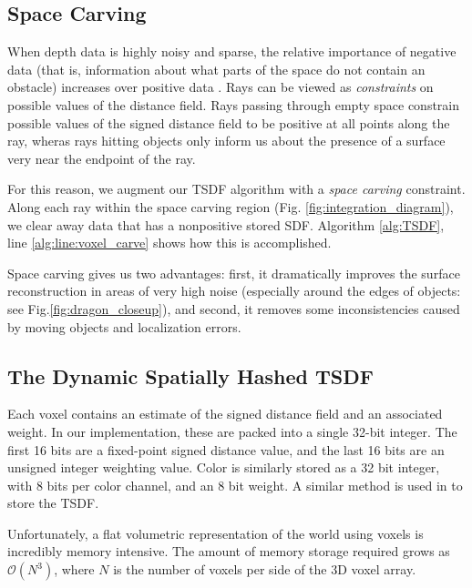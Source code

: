 \documentclass[10pt,twocolumn,letterpaper]{article}
\newcommand{\figref}[1]{Fig.\ref{#1}}
\begin{document}
\subsection{Space Carving}
\label{section:carving}
When depth data is highly noisy and sparse, the relative importance of negative
data (that is, information about what parts of the space do not contain an
obstacle) increases over positive data \cite{Klingensmith2014}. Rays can be
viewed as \textit{constraints} on possible values of the distance field. Rays
passing through empty space constrain possible values of the signed distance
field to be positive at all points along the ray, wheras rays hitting objects 
only inform us about the presence of a surface very near the endpoint of the ray.

For this reason, we augment our TSDF algorithm with a \textit{space carving}
constraint. Along each ray within the space carving region (Fig.
\ref{fig:integration_diagram}), we clear away data that has a nonpositive stored
SDF. Algorithm \ref{alg:TSDF}, line \ref{alg:line:voxel_carve} shows how this is
accomplished. 

Space carving gives us two advantages: first, it dramatically improves the
surface reconstruction in areas of very high noise (especially around the edges
of objects: see \figref{fig:dragon_closeup}), and second, it removes
some inconsistencies caused by moving objects and localization errors. 

\subsection{The Dynamic Spatially Hashed TSDF}
\label{section:spatialhash}
Each voxel contains an estimate of the signed distance field and an
associated weight. In our implementation, these are packed into a single 32-bit
integer. The first 16 bits are a fixed-point signed distance value, and the
last 16 bits  are an unsigned integer weighting value. Color is similarly
stored as a 32 bit integer, with 8 bits per color channel, and an 8 bit weight.
A similar method is used in \cite{Newcombe, Whelan2013, Bylow2013} to store the
TSDF.

Unfortunately, a flat volumetric representation of the world using voxels is
incredibly memory intensive. The amount of memory storage required grows as
$\mathcal{O}(N^3)$, where $N$ is the number of voxels per side of the 3D voxel
array. 

\end{document}
